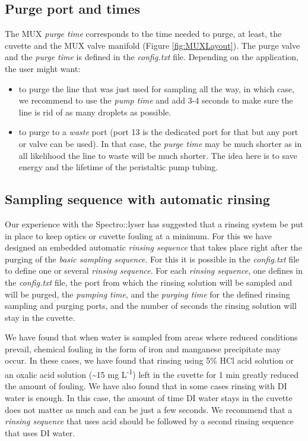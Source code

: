 \documentclass[]{book}
\providecommand{\tightlist}{%
  \setlength{\itemsep}{0pt}\setlength{\parskip}{0pt}}
\begin{document}
\hypertarget{purge-port-and-times}{%
\subsection{Purge port and times}\label{purge-port-and-times}}

The MUX \emph{purge time} corresponds to the time needed to purge, at least, the cuvette and the MUX valve manifold (Figure \ref{fig:MUXLayout}). The purge valve and the \emph{purge time} is defined in the \emph{config.txt} file. Depending on the application, the user might want:

\begin{itemize}
\tightlist
\item
  to purge the line that was just used for sampling all the way, in which case, we recommend to use the \emph{pump time} and add 3-4 seconds to make sure the line is rid of as many droplets as possible.
\item
  to purge to a \emph{waste} port (port 13 is the dedicated port for that but any port or valve can be used). In that case, the \emph{purge time} may be much shorter as in all likelihood the line to waste will be much shorter. The idea here is to save energy and the lifetime of the peristaltic pump tubing.
\end{itemize}

\hypertarget{sampling-sequence-with-automatic-rinsing}{%
\subsection{Sampling sequence with automatic rinsing}\label{sampling-sequence-with-automatic-rinsing}}

Our experience with the Spectro::lyser has suggested that a rinsing system be put in place to keep optics or cuvette fouling at a minimum. For this we have designed an embedded automatic \emph{rinsing sequence} that takes place right after the purging of the \emph{basic sampling sequence}. For this it is possible in the \emph{config.txt} file to define one or several \emph{rinsing sequence}. For each \emph{rinsing sequence}, one defines in the \emph{config.txt} file, the port from which the rinsing solution will be sampled and will be purged, the \emph{pumping time}, and the \emph{purging time} for the defined rinsing sampling and purging ports, and the number of seconds the rinsing solution will stay in the cuvette.

We have found that when water is sampled from areas where reduced conditions prevail, chemical fouling in the form of iron and manganese precipitate may occur. In these cases, we have found that rinsing using 5\% HCl acid solution or an oxalic acid solution (\textasciitilde{}15 mg L\textsuperscript{-1}) left in the cuvette for 1 min greatly reduced the amount of fouling. We have also found that in some cases rinsing with DI water is enough. In this case, the amount of time DI water stays in the cuvette does not matter as much and can be just a few seconds. We recommend that a \emph{rinsing sequence} that uses acid should be followed by a second rinsing sequence that uses DI water.
\end{document}
